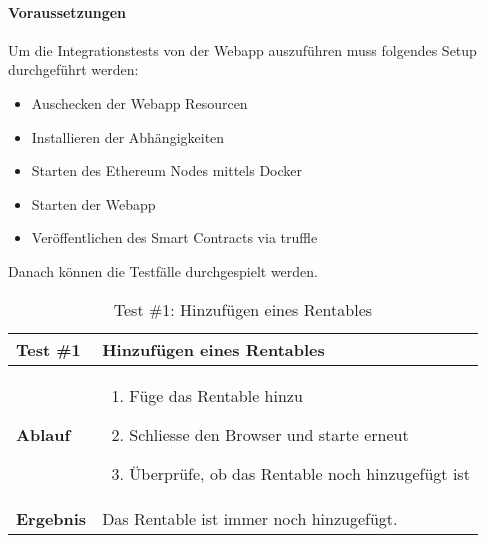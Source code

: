 \paragraph{Voraussetzungen}

Um die Integrationstests von der Webapp auszuführen muss folgendes Setup durchgeführt werden:

\begin{itemize}
    \item Auschecken der Webapp Resourcen
    \item Installieren der Abhängigkeiten
    \item Starten des Ethereum Nodes mittels Docker
    \item Starten der Webapp
    \item Veröffentlichen des Smart Contracts via truffle 
\end{itemize}

Danach können die Testfälle durchgespielt werden.


\begin{table}[H]
\centering
\caption{Test \#1: Hinzufügen eines Rentables }
\label{my-label}
\begin{tabular}{@{}L{1.6cm}L{11cm}@{}}
\toprule
\textbf{Test \#1}
& Hinzufügen eines Rentables
\\ \midrule
\textbf{Ablauf}
& 
\begin{enumerate}
    \item Füge das Rentable hinzu
    \item Schliesse den Browser und starte erneut
    \item Überprüfe, ob das Rentable noch hinzugefügt ist
\end{enumerate}
\\ \midrule
\textbf{Ergebnis}
& Das Rentable ist immer noch hinzugefügt.
\\ \bottomrule
\end{tabular}
\end{table}


